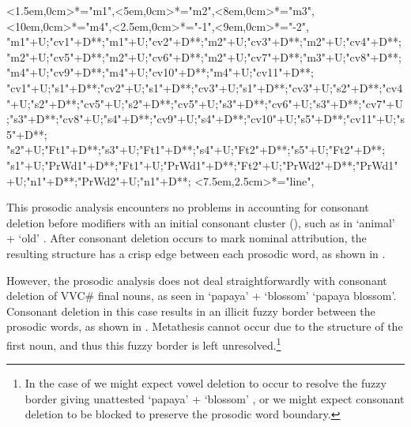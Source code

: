 \begin{multicols}{2}
\begin{exe}
{			<1.5em,0cm>*="m1",<5em,0cm>*="m2",<8em,0cm>*="m3",<10em,0cm>*="m4",<2.5em,0cm>*\as{-}="-1",<9em,0cm>*\as{-}="-2",
			"m1"+U;"cv1"+D**\dir{-};"m1"+U;"cv2"+D**\dir{-};"m2"+U;"cv3"+D**\dir{-};"m2"+U;"cv4"+D**\dir{-};"m2"+U;"cv5"+D**\dir{-};"m2"+U;"cv6"+D**\dir{-};"m2"+U;"cv7"+D**\dir{-};"m3"+U;"cv8"+D**\dir{-};"m4"+U;"cv9"+D**\dir{-};"m4"+U;"cv10"+D**\dir{-};"m4"+U;"cv11"+D**\dir{-};
			"cv1"+U;"s1"+D**\dir{-};"cv2"+U;"s1"+D**\dir{-};"cv3"+U;"s1"+D**\dir{-};"cv3"+U;"s2"+D**\dir{-};"cv4"+U;"s2"+D**\dir{-};"cv5"+U;"s2"+D**\dir{-};"cv5"+U;"s3"+D**\dir{-};"cv6"+U;"s3"+D**\dir{-};"cv7"+U;"s3"+D**\dir{-};"cv8"+U;"s4"+D**\dir{-};"cv9"+U;"s4"+D**\dir{-};"cv10"+U;"s5"+D**\dir{-};"cv11"+U;"s5"+D**\dir{-};
			"s2"+U;"Ft1"+D**\dir{-};"s3"+U;"Ft1"+D**\dir{-};"s4"+U;"Ft2"+D**\dir{-};"s5"+U;"Ft2"+D**\dir{-};
			"s1"+U;"PrWd1"+D**\dir{-};"Ft1"+U;"PrWd1"+D**\dir{-};"Ft2"+U;"PrWd2"+D**\dir{-};"PrWd1"+U;"n1"+D**\dir{-};"PrWd2"+U;"n1"+D**\dir{-};
			<7.5em,2.5cm>*="line",
		\endxy}\label{as:nahoniq-nain}
	\end{exe}
\end{multicols}

This prosodic analysis encounters no problems in
accounting for consonant deletion before
modifiers with an initial consonant cluster (),
such as in  `animal' +  `old' {\ra} .
After consonant deletion occurs to mark nominal attribution,
the resulting structure has a crisp edge between each prosodic word,
as shown in .

However, the prosodic analysis does not deal straightforwardly
with consonant deletion of VVC{\#} final nouns,
as seen in  `papaya' +  `blossom'
{\ra}  `papaya blossom'.
Consonant deletion in this case results in an illicit
fuzzy border between the prosodic words, as shown in .
Metathesis cannot occur due to the structure of the first noun,
and thus this fuzzy border is left unresolved.\footnote{
		In the case of  we might expect
		vowel deletion to occur to resolve the fuzzy border
		giving unattested  `papaya' +  `blossom'
		{\ra} , or we might expect
		consonant deletion to be blocked to preserve the prosodic word boundary.}


